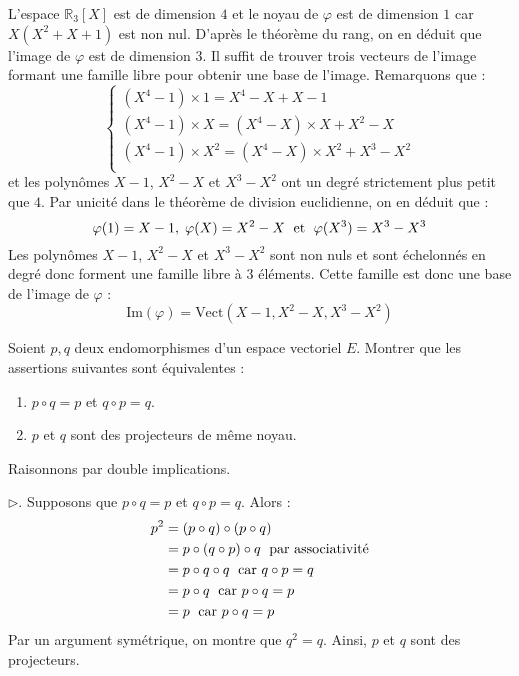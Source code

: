 \documentclass[a4paper,10pt]{report}
\begin{document}
\medskip

\noindent L'espace $\mathbb{R}_3[X]$ est de dimension $4$ et le noyau de $\varphi$ est de dimension $1$ car $X(X^2+X+1)$ est non nul. D'après le théorème du rang, on en déduit que l'image de $\varphi$ est de dimension $3$. Il suffit de trouver trois vecteurs de l'image formant une famille libre pour obtenir une base de l'image. Remarquons que :
$$ \left\lbrace \begin{array}{l}
(X^4-1) \times 1 = X^4-X + X-1 \\
(X^4-1) \times X = (X^4-X) \times X + X^2-X\\
(X^4-1) \times X^2 = (X^4-X) \times X^2 + X^3-X^2\\
\end{array}\right.$$
et les polynômes $X-1$, $X^2-X$ et $X^3-X^2$ ont un degré strictement plus petit que $4$. Par unicité dans le théorème de division euclidienne, on en déduit que :
$$ \varphi(1)= X-1, \; \varphi(X)= X^2-X \; \hbox{ et } \; \varphi(X^3) = X^3-X^3$$
Les polynômes $X-1$, $X^2-X$ et $X^3-X^2$ sont non nuls et sont échelonnés  en degré donc forment une famille libre à $3$ éléments. Cette famille est donc une base de l'image de $\varphi$ :
$$ \textrm{Im}(\varphi) = \textrm{Vect}(X-1,X^2-X,X^3-X^2)$$

\begin{Exa} Soient $p,q$ deux endomorphismes d'un espace vectoriel $E$. Montrer que les assertions suivantes sont équivalentes :
    \begin{enumerate}
\item $p \circ q = p$ et $q \circ p = q$.
\item $p$ et $q$ sont des projecteurs de même noyau.
    \end{enumerate}
\end{Exa}

\corr Raisonnons par double implications.

\medskip

\noindent $\rhd$. Supposons que $p \circ q = p$ et $q \circ p = q$.  Alors :
\begin{align*}
p^2 & = (p \circ q) \circ (p \circ q) \\
&=p \circ (q \circ p) \circ q \; \hbox{ par associativité} \\
& =p \circ q \circ q  \; \hbox{ car } q \circ p = q\\
&=  p \circ q \; \hbox{ car } p \circ q = p\\
& = p \; \hbox{ car }  p\circ q = p
\end{align*}
Par un argument symétrique, on montre que $q^2=q$. Ainsi, $p$ et $q$ sont des projecteurs.
\end{document}
